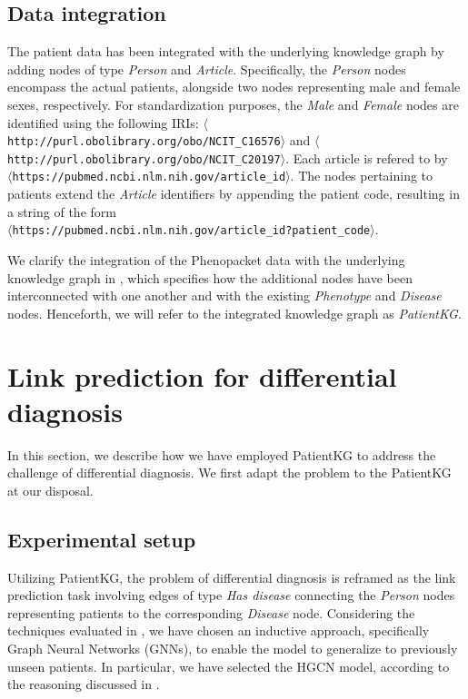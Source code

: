 \subsection{Data integration}
The patient data has been integrated with the underlying knowledge graph by adding nodes of type \emph{Person} and \emph{Article}. Specifically, the \emph{Person} nodes encompass the actual patients, alongside two nodes representing male and female sexes, respectively. For standardization purposes, the \emph{Male} and \emph{Female} nodes are identified using the following IRIs: \texttt{$\langle$http://purl.obolibrary.org/obo/NCIT\_C16576$\rangle$} and \texttt{$\langle$http://purl.obolibrary.org/obo/NCIT\_C20197$\rangle$}. Each article is refered to by \\ \texttt{$\langle$https://pubmed.ncbi.nlm.nih.gov/{article\_id}$\rangle$}. The nodes pertaining to patients extend the \emph{Article} identifiers by appending the patient code, resulting in a string of the form \\ \texttt{$\langle$https://pubmed.ncbi.nlm.nih.gov/{article\_id}?{patient\_code}$\rangle$}. 

We clarify the integration of the Phenopacket data with the underlying knowledge graph in , which specifies how the additional nodes have been interconnected with one another and with the existing \emph{Phenotype} and \emph{Disease} nodes. Henceforth, we will refer to the integrated knowledge graph as \emph{PatientKG}.


\section{Link prediction for differential diagnosis}\label{sec:linkPredictionDiffDiagnosis}
In this section, we describe how we have employed PatientKG to address the challenge of differential diagnosis. We first adapt the problem to the PatientKG at our disposal.

\subsection{Experimental setup}\label{sec:expsetup}
Utilizing PatientKG, the problem of differential diagnosis is reframed as the link prediction task involving edges of type \emph{Has disease} connecting the \emph{Person} nodes representing patients to the corresponding \emph{Disease} node. Considering the techniques evaluated in , we have chosen an inductive approach, specifically Graph Neural Networks (GNNs), to enable the model to generalize to previously unseen patients. In particular, we have selected the HGCN model, according to the reasoning discussed in .

